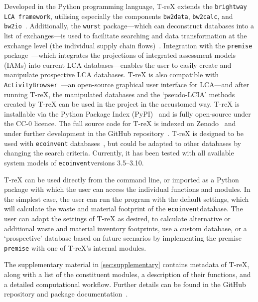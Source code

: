 \documentclass[a4paper,fleqn]{cas-dc}
\renewcommand{\texttt}[1]{{\ttfamily\small\nolinkurl{#1}}}
\begin{document}
Developed in the Python programming language, T-reX extends the
\texttt{brightway LCA framework}, utilising especially the components
\texttt{bw2data}, \texttt{bw2calc}, and
\texttt{bw2io}~\citep{mutel2017brightway}. Additionally, the \texttt{wurst}
package---which can deconstruct databases into a list of exchanges---is used to
facilitate searching and data transformation at the exchange level (the
individual supply chain flows)~\citep{mutel2017wurst}. Integration with the
\texttt{premise} package~\citep{sacchi2022premise}---which integrates the
projections of integrated assessment models (IAMs) into current LCA
databases---enables the user to easily create and manipulate prospective LCA
databases. T-reX is also compatible with
\texttt{ActivityBrowser}~\citep{steubing2020activitybrowser}---an open-source
graphical user interface for LCA---and after running T-reX, the manipulated
databases and the `pseudo-LCIA' methods created by T-reX can be used in the
project in the accustomed way. T-reX is installable via the Python Package
Index (PyPI)~\citep{mcdowall2023T-reXpipy} and is fully open-source under the
CC-0 licence. The full source code for T-reX is indexed on
Zenodo~\citep{mcdowall2023T-reXzenodo} and under further development in the
GitHub repository~\citep{mcdowall2024T-reXgithub}. T-reX is designed to be used
with \texttt{ecoinvent} databases~\citep{ecoinvent2016version3}, but could be
adapted to other databases by changing the search criteria. Currently, it has
been tested with all available system models of \texttt{ecoinvent}versions
3.5--3.10.

T-reX can be used directly from the command line, or imported as a Python
package with which the user can access the individual functions and modules. In
the simplest case, the user can run the program with the default settings,
which will calculate the waste and material footprint of the
\texttt{ecoinvent}database. The user can adapt the settings of T-reX as
desired, to calculate alternative or additional waste and material inventory
footprints, use a custom database, or a `prospective' database based on future
scenarios by implementing the premise \texttt{premise} with one of T-reX's
internal modules.

The supplementary material in \autoref{sec:supplementary} contains metadata of
T-reX, along with a list of the constituent modules, a description of their
functions, and a detailed computational workflow. Further details can be found
in the GitHub repository and package
documentation~\citep{mcdowall2024T-reXgithub, mcdowall2023T-reXdocs}.
\end{document}
